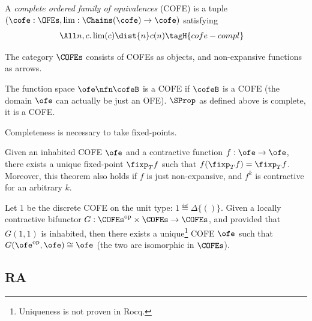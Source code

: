 \begin{defn}
  A \emph{complete ordered family of equivalences} (COFE) is a tuple $(\cofe : \OFEs,  \lim : \Chains(\cofe) \to \cofe)$ satisfying
  \begin{align*}
    \All n, c.& \lim(c) \dist{n} c(n) \tagH{cofe-compl}
  \end{align*}
\end{defn}

\begin{defn}
  The category $\COFEs$ consists of COFEs as objects, and non-expansive functions as arrows.
\end{defn}

The function space $\ofe \nfn \cofeB$ is a COFE if $\cofeB$ is a COFE (\ie the domain $\ofe$ can actually be just an OFE).
$\SProp$ as defined above is complete, \ie it is a COFE.

Completeness is necessary to take fixed-points.

\begin{thm}
\label{thm:banach}
Given an inhabited COFE $\ofe$ and a contractive function $f : \ofe \to \ofe$, there exists a unique fixed-point $\fixp_T f$ such that $f(\fixp_T f) = \fixp_T f$.
Moreover, this theorem also holds if $f$ is just non-expansive, and $f^k$ is contractive for an arbitrary $k$.
\end{thm}

\begin{thm}
\label{thm:america_rutten}
Let $1$ be the discrete COFE on the unit type: $1 \eqdef \Delta \{ () \}$.
Given a locally contractive bifunctor $G : \COFEs^{\textrm{op}} \times \COFEs \to \COFEs$, and provided that \(G(1, 1)\) is inhabited,
then there exists a unique\footnote{Uniqueness is not proven in Rocq.} COFE $\ofe$ such that $G(\ofe^{\textrm{op}}, \ofe) \cong \ofe$ (\ie the two are isomorphic in $\COFEs$).
\end{thm}

\subsection{RA}

